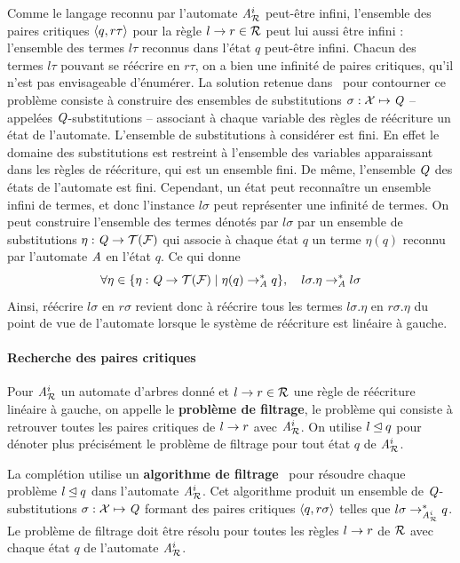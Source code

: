 Comme le langage reconnu par l'automate ${\mathit A}_{\mathcal R}^i$ peut-être infini, l'ensemble
des paires critiques $\langle q, r\tau\rangle$ pour la règle $l\rightarrow r\in \mathcal R$ peut lui aussi être infini : 
l'ensemble des termes $l\tau$ reconnus dans l'état $q$ peut-être infini. Chacun des termes $l\tau$
pouvant se réécrire en $r\tau$, on a bien une infinité de paires critiques, qu'il n'est pas envisageable
d'énumérer.
La solution retenue dans~\cite{Genet-RTA98} pour contourner ce problème consiste à construire des ensembles de
substitutions $\sigma: \mathcal X \mapsto \mathit Q$ -- appelées $\mathit Q$-substitutions -- associant à chaque variable des règles de réécriture 
un état de l'automate. L'ensemble de substitutions à considérer est fini. En effet le domaine des substitutions est restreint à l'ensemble des
variables apparaissant dans les règles de réécriture, qui est un ensemble fini. De même, l'ensemble $\mathit Q$ des états de l'automate est fini.
Cependant, un état peut reconnaître un ensemble infini de termes, et donc l'instance $l\sigma$ peut représenter une infinité de termes.
On peut construire l'ensemble des termes dénotés par $l\sigma$ par un ensemble de substitutions $\eta: \mathit Q \rightarrow \mathcal{T(F)}$ qui associe à chaque état $q$ 
un terme $\eta(q)$ reconnu par l'automate $\mathit A$ en l'état $q$. %
Ce qui donne 
\[\forall \eta \in \{ \eta : \mathit Q \rightarrow \mathcal{T(F)} \; | \; \eta(q) \rightarrow_\mathit A^* q\},\quad l\sigma.\eta \rightarrow^*_\mathit A  l\sigma\]
Ainsi, réécrire $l\sigma$ en $r\sigma$ revient donc à réécrire tous les termes $l\sigma.\eta$ en $r\sigma.\eta$ du point de vue de l'automate
lorsque le système de réécriture est linéaire à gauche.

\paragraph{Recherche des paires critiques}
\label{sec:recherche-des-paires}

\begin{definition}
  Pour ${\mathit A}_{\mathcal R}^i$ un automate d'arbres donné et $l \rightarrow r \in \mathcal R$ une
  règle de réécriture linéaire à gauche, on appelle le \textbf{problème de filtrage}, le
  problème qui consiste à retrouver toutes les paires critiques de $l
  \rightarrow r$ avec ${\mathit A}_{\mathcal R}^i$. On utilise $l \unlhd q$ pour dénoter plus précisément
  le problème de filtrage pour tout état $q$ de ${\mathit A}_{\mathcal R}^i$.
\end{definition}

La complétion utilise un \textbf{algorithme de filtrage}~\cite{FeuilladeGVTT-JAR04}
pour résoudre chaque problème $l \unlhd q$ dans l'automate ${\mathit A}_{\mathcal R}^i$. 
Cet algorithme produit un ensemble de $\mathit Q$-substitutions $\sigma: \mathcal X \mapsto \mathit Q$
formant des paires critiques $\langle q, r\sigma\rangle$ telles que $l\sigma \rightarrow_{{\mathit A}_{\mathcal R}^i}^* q$.
Le problème de filtrage doit être résolu pour toutes les règles $l\rightarrow r$ de $\mathcal R$ avec
chaque état $q$ de l'automate ${\mathit A}_{\mathcal R}^i$.

